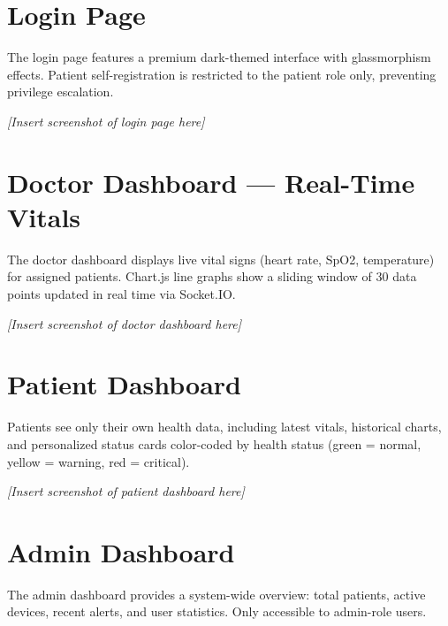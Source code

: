 \documentclass[12pt,a4paper]{report}
\begin{document}
\section{Login Page}
The login page features a premium dark-themed interface with glassmorphism effects. Patient self-registration is restricted to the patient role only, preventing privilege escalation.


\noindent\textit{[Insert screenshot of login page here]}

\section{Doctor Dashboard --- Real-Time Vitals}
The doctor dashboard displays live vital signs (heart rate, SpO2, temperature) for assigned patients. Chart.js line graphs show a sliding window of 30 data points updated in real time via Socket.IO.


\noindent\textit{[Insert screenshot of doctor dashboard here]}

\section{Patient Dashboard}
Patients see only their own health data, including latest vitals, historical charts, and personalized status cards color-coded by health status (green = normal, yellow = warning, red = critical).


\noindent\textit{[Insert screenshot of patient dashboard here]}

\section{Admin Dashboard}
The admin dashboard provides a system-wide overview: total patients, active devices, recent alerts, and user statistics. Only accessible to admin-role users.
\end{document}
